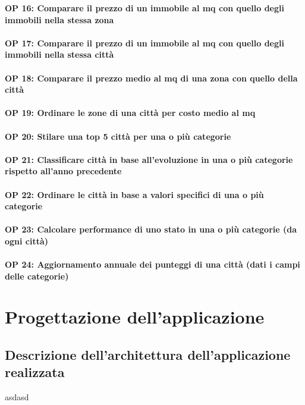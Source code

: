 \documentclass[a4paper,12pt]{report}
\begin{document}
            \textbf{OP 16: Comparare il prezzo di un immobile al mq con quello degli immobili nella stessa zona} \\
             \\
            \textbf{OP 17: Comparare il prezzo di un immobile al mq con quello degli immobili nella stessa città} \\
             \\
            \textbf{OP 18: Comparare il prezzo medio al mq di una zona con quello della città} \\
             \\
            \textbf{OP 19: Ordinare le zone di una città per costo medio al mq} \\
             \\
            \textbf{OP 20: Stilare una top 5 città per una o più categorie} \\
             \\
            \textbf{OP 21: Classificare città in base all’evoluzione in una o più categorie rispetto all’anno precedente} \\
             \\
            \textbf{OP 22: Ordinare le città in base a valori specifici di una o più categorie} \\
             \\
            \textbf{OP 23: Calcolare performance di uno stato in una o più categorie (da ogni città)} \\
             \\
            \textbf{OP 24: Aggiornamento annuale dei punteggi di una città (dati i campi delle categorie)} \\
            

        \chapter{Progettazione dell'applicazione}
            
    	\section{Descrizione dell'architettura dell'applicazione realizzata}
        	asdasd
 
\end{document}
